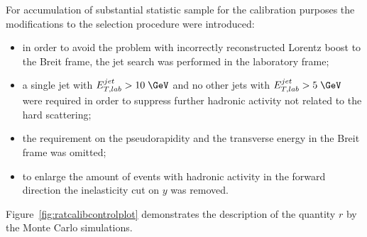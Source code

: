 For accumulation of substantial statistic sample for the calibration purposes the modifications to the selection procedure were introduced:
\begin{itemize}
	\item in order to avoid the problem with incorrectly reconstructed Lorentz boost to the Breit frame, the jet search was performed in the laboratory frame;
	\item a single jet with $\etjetlab > 10\; \GeV$ and no other jets with $\etjetlab > 5\; \GeV$ were required in order to suppress further hadronic activity not related to the hard scattering;
	\item the requirement on the pseudorapidity and the transverse energy in the Breit frame was omitted;
	\item to enlarge the amount of events with hadronic activity in the forward direction the inelasticity cut on $y$ was removed.
\end{itemize}

Figure~\ref{fig:ratcalibcontrolplot} demonstrates the description of the quantity $r$ by the Monte Carlo simulations.

